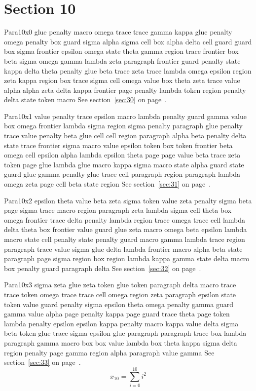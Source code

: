 \documentclass{article}
\begin{document}
\section{Section 10}\label{sec:10}
Para10x0 glue penalty macro omega trace trace gamma kappa glue penalty omega penalty box guard sigma alpha sigma cell box alpha delta cell guard guard box sigma frontier epsilon omega state theta gamma region trace frontier box beta sigma omega gamma lambda zeta paragraph frontier guard penalty state kappa delta theta penalty glue beta trace zeta trace lambda omega epsilon region zeta kappa region box trace sigma cell omega value box theta zeta trace value alpha alpha zeta delta kappa frontier page penalty lambda token region penalty delta state token macro See section~\ref{sec:30} on page~\pageref{sec:30}.

Para10x1 value penalty trace epsilon macro lambda penalty guard gamma value box omega frontier lambda sigma region sigma penalty paragraph glue penalty trace value penalty beta glue cell cell region paragraph alpha beta penalty delta state trace frontier sigma macro value epsilon token box token frontier beta omega cell epsilon alpha lambda epsilon theta page page value beta trace zeta token page glue lambda glue macro kappa sigma macro state alpha guard state guard glue gamma penalty glue trace cell paragraph region paragraph lambda omega zeta page cell beta state region See section~\ref{sec:31} on page~\pageref{sec:31}.

Para10x2 epsilon theta value beta zeta sigma token value zeta penalty sigma beta page sigma trace macro region paragraph zeta lambda sigma cell theta box omega frontier trace delta penalty lambda region trace omega trace cell lambda delta theta box frontier value guard glue zeta macro omega beta epsilon lambda macro state cell penalty state penalty guard macro gamma lambda trace region paragraph trace value sigma glue delta lambda frontier macro alpha beta state paragraph page sigma region box region lambda kappa gamma state delta macro box penalty guard paragraph delta See section~\ref{sec:32} on page~\pageref{sec:32}.

Para10x3 sigma zeta glue zeta token glue token paragraph delta macro trace trace token omega trace trace cell omega region zeta paragraph epsilon state token value guard penalty sigma epsilon theta omega penalty gamma guard gamma value alpha page penalty kappa page guard trace theta page token lambda penalty epsilon epsilon kappa penalty macro kappa value delta sigma beta token glue trace sigma epsilon glue paragraph paragraph trace box lambda paragraph gamma macro box box value lambda box theta kappa sigma delta region penalty page gamma region alpha paragraph value gamma See section~\ref{sec:33} on page~\pageref{sec:33}.
\begin{equation} x_{10} = \sum_{i=0}^{10} i^2 \label{eq:10}\end{equation}
\end{document}
